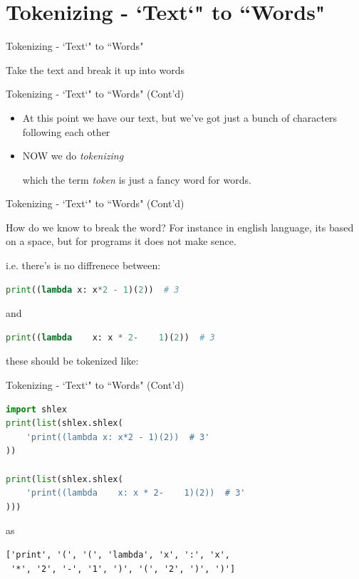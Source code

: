 \documentclass[aspectratio=169, dvipsnames, svgnames, x11names]{beamer}
\begin{document}
\section{Tokenizing - `Text`" to ``Words"}
\begin{frame}{Tokenizing - `Text`" to ``Words"}
\begin{itemize}
{\LARGE \item[-] Take the text and break it up into words}
\end{itemize}
\end{frame}

\begin{frame}{Tokenizing - `Text`" to ``Words" (Cont'd)}
\begin{itemize}
\item[-]<1>
At this point we have our text, but we’ve got just a bunch of characters following each other

\item[-]<2> NOW we do \textit{tokenizing}

which the term \textit{token} is just a fancy word for words.
\end{itemize}
\end{frame}

\begin{frame}[fragile]{Tokenizing - `Text`" to ``Words" (Cont'd)}
\begin{flushleft}
How do we know to break the word? For instance in english language, its based on a space, but for programs it
does not make sence. 

i.e. there's is no diffrenece between:
\begin{lstlisting}[language=python, keywordstyle=\color{Mulberry}\textbf]
print((lambda x: x*2 - 1)(2))  # 3
\end{lstlisting}
and
\begin{lstlisting}[language=python, keywordstyle=\color{Mulberry}\textbf]
print((lambda    x: x * 2-    1)(2))  # 3
\end{lstlisting}
these should be tokenized like:
\end{flushleft}
\end{frame}

\begin{frame}[fragile]{Tokenizing - `Text`" to ``Words" (Cont'd)}
\begin{flushleft}
\begin{lstlisting}[language=python, keywordstyle=\color{Mulberry}\textbf]
import shlex
print(list(shlex.shlex(
    'print((lambda x: x*2 - 1)(2))  # 3'
))

print(list(shlex.shlex(
    'print((lambda    x: x * 2-    1)(2))  # 3'
)))
\end{lstlisting}
as
\begin{lstlisting}
['print', '(', '(', 'lambda', 'x', ':', 'x',
 '*', '2', '-', '1', ')', '(', '2', ')', ')']
\end{lstlisting}
\end{flushleft}
\end{frame}
\end{document}
